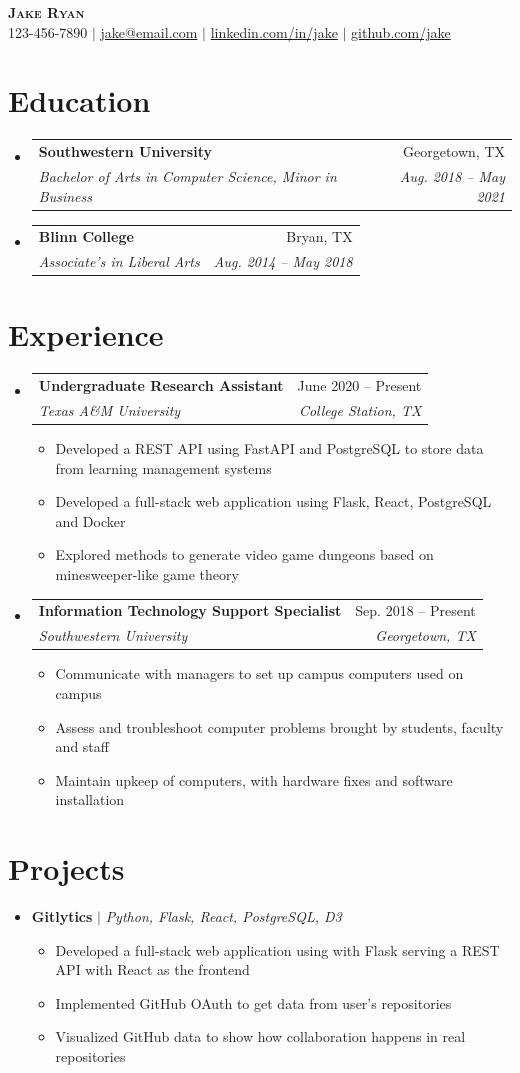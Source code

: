 \documentclass[letterpaper,11pt]{article}
\makeatletter
\newcommand{\resumeItem}[1]{\item\small{#1 \vspace{-2pt}}}
\newcommand{\resumeSubheading}[4]{
  \vspace{-2pt}\item
    \begin{tabular*}{0.97\textwidth}[t]{l@{\extracolsep{\fill}}r}
      \textbf{#1} & #2 \\
      \textit{\small#3} & \textit{\small #4} \\
    \end{tabular*}\vspace{-7pt}
}
\newcommand{\resumeSubItem}[1]{\resumeItem{#1}\vspace{-4pt}}
\newcommand{\resumeSubHeadingListStart}{\begin{itemize}[leftmargin=0.15in, label={}]}
\newcommand{\resumeSubHeadingListEnd}{\end{itemize}}
\newcommand{\resumeItemListStart}{\begin{itemize}}
\newcommand{\resumeItemListEnd}{\end{itemize}\vspace{-5pt}}
\makeatother
\begin{document}
\begin{center}
    \textbf{\Huge \scshape Jake Ryan} \\ \vspace{1pt}
    \small 123-456-7890 $|$ \href{mailto:jake@email.com}{jake@email.com} $|$
    \href{https://linkedin.com/in/jake}{linkedin.com/in/jake} $|$
    \href{https://github.com/jake}{github.com/jake}
\end{center}

\section{Education}
  \resumeSubHeadingListStart
    \resumeSubheading
      {Southwestern University}{Georgetown, TX}
      {Bachelor of Arts in Computer Science, Minor in Business}{Aug. 2018 -- May 2021}
    \resumeSubheading
      {Blinn College}{Bryan, TX}
      {Associate's in Liberal Arts}{Aug. 2014 -- May 2018}
  \resumeSubHeadingListEnd

\section{Experience}
  \resumeSubHeadingListStart
    \resumeSubheading
      {Undergraduate Research Assistant}{June 2020 -- Present}
      {Texas A\&M University}{College Station, TX}
      \resumeItemListStart
        \resumeItem{Developed a REST API using FastAPI and PostgreSQL to store data from learning management systems}
        \resumeItem{Developed a full-stack web application using Flask, React, PostgreSQL and Docker}
        \resumeItem{Explored methods to generate video game dungeons based on minesweeper-like game theory}
      \resumeItemListEnd
    \resumeSubheading
      {Information Technology Support Specialist}{Sep. 2018 -- Present}
      {Southwestern University}{Georgetown, TX}
      \resumeItemListStart
        \resumeItem{Communicate with managers to set up campus computers used on campus}
        \resumeItem{Assess and troubleshoot computer problems brought by students, faculty and staff}
        \resumeItem{Maintain upkeep of computers, with hardware fixes and software installation}
      \resumeItemListEnd
  \resumeSubHeadingListEnd

\section{Projects}
    \resumeSubHeadingListStart
      \resumeSubItem{\textbf{Gitlytics} $|$ \emph{Python, Flask, React, PostgreSQL, D3}}
        \resumeItemListStart
          \resumeItem{Developed a full-stack web application using with Flask serving a REST API with React as the frontend}
          \resumeItem{Implemented GitHub OAuth to get data from user's repositories}
          \resumeItem{Visualized GitHub data to show how collaboration happens in real repositories}
        \resumeItemListEnd
    \resumeSubHeadingListEnd
\end{document}
